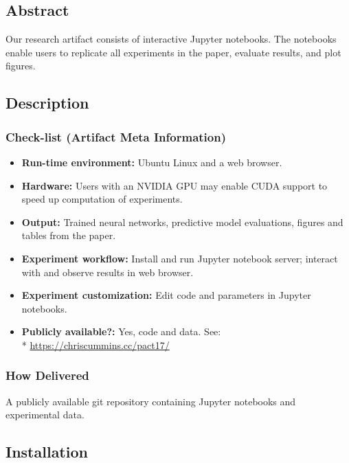 \flushcolsend
\clearpage
{}


\subsection{Abstract}

Our research artifact consists of interactive Jupyter notebooks. The notebooks
enable users to replicate all experiments in the paper, evaluate results, and
plot figures.

\subsection{Description}

\subsubsection{Check-list (Artifact Meta Information)}

{\small
\begin{itemize}
  \item {\bf Run-time environment: }Ubuntu Linux and a web browser.
  \item {\bf Hardware: }Users with an NVIDIA GPU may enable CUDA support to
    speed up computation of experiments.
  \item {\bf Output: }Trained neural networks, predictive model evaluations,
    figures and tables from the paper.
  \item {\bf Experiment workflow: }Install and run Jupyter notebook server;
    interact with and observe results in web browser.
  \item {\bf Experiment customization: }Edit code and parameters in Jupyter
    notebooks.
  \item {\bf Publicly available?: }Yes, code and data. See:\\*
    \url{https://chriscummins.cc/pact17/}
  \end{itemize}
}

\subsubsection{How Delivered}

A publicly available git repository containing Jupyter notebooks and
experimental data.


\subsection{Installation}\label{subsec:installation}

